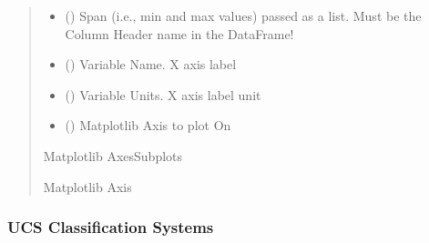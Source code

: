 \documentclass[letterpaper,10pt,english]{sphinxmanual}
\begin{document}
\begin{fulllineitems}
\begin{fulllineitems}
\begin{quote}
\begin{description}
\begin{itemize}
\item {} 
\sphinxAtStartPar
{} (\sphinxstyleliteralemphasis{\sphinxupquote{{[}}}\sphinxstyleliteralemphasis{\sphinxupquote{, }}\sphinxstyleliteralemphasis{\sphinxupquote{{]}}}) \textendash{} Span (i.e., min and max values) passed as a list. Must be the Column Header name in the DataFrame!

\item {} 
\sphinxAtStartPar
{} () \textendash{} Variable Name. X axis label

\item {} 
\sphinxAtStartPar
{} () \textendash{} Variable Units. X axis label unit

\item {} 
\sphinxAtStartPar
{} () \textendash{} Matplotlib Axis to plot On

\end{itemize}

\sphinxAtStartPar
Matplotlib AxesSubplots

\sphinxAtStartPar
Matplotlib Axis

\end{description}\end{quote}

\end{fulllineitems}


\end{fulllineitems}



\subsubsection{UCS Classification Systems}
\label{\detokenize{pyrockmodulus:module-pyrockmodulus.rock_variables}}\label{\detokenize{pyrockmodulus:ucs-classification-systems}}
\end{document}
